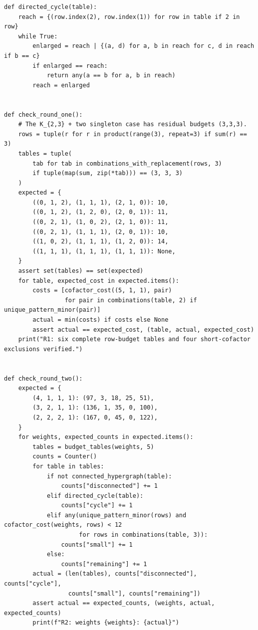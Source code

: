 \documentclass[11pt,a4paper,oneside]{report}
\theoremstyle{definition}
\theoremstyle{remark}
\begin{document}
\begin{lstlisting}
def directed_cycle(table):
    reach = {(row.index(2), row.index(1)) for row in table if 2 in row}
    while True:
        enlarged = reach | {(a, d) for a, b in reach for c, d in reach if b == c}
        if enlarged == reach:
            return any(a == b for a, b in reach)
        reach = enlarged


def check_round_one():
    # The K_{2,3} + two singleton case has residual budgets (3,3,3).
    rows = tuple(r for r in product(range(3), repeat=3) if sum(r) == 3)
    tables = tuple(
        tab for tab in combinations_with_replacement(rows, 3)
        if tuple(map(sum, zip(*tab))) == (3, 3, 3)
    )
    expected = {
        ((0, 1, 2), (1, 1, 1), (2, 1, 0)): 10,
        ((0, 1, 2), (1, 2, 0), (2, 0, 1)): 11,
        ((0, 2, 1), (1, 0, 2), (2, 1, 0)): 11,
        ((0, 2, 1), (1, 1, 1), (2, 0, 1)): 10,
        ((1, 0, 2), (1, 1, 1), (1, 2, 0)): 14,
        ((1, 1, 1), (1, 1, 1), (1, 1, 1)): None,
    }
    assert set(tables) == set(expected)
    for table, expected_cost in expected.items():
        costs = [cofactor_cost((5, 1, 1), pair)
                 for pair in combinations(table, 2) if unique_pattern_minor(pair)]
        actual = min(costs) if costs else None
        assert actual == expected_cost, (table, actual, expected_cost)
    print("R1: six complete row-budget tables and four short-cofactor exclusions verified.")


def check_round_two():
    expected = {
        (4, 1, 1, 1): (97, 3, 18, 25, 51),
        (3, 2, 1, 1): (136, 1, 35, 0, 100),
        (2, 2, 2, 1): (167, 0, 45, 0, 122),
    }
    for weights, expected_counts in expected.items():
        tables = budget_tables(weights, 5)
        counts = Counter()
        for table in tables:
            if not connected_hypergraph(table):
                counts["disconnected"] += 1
            elif directed_cycle(table):
                counts["cycle"] += 1
            elif any(unique_pattern_minor(rows) and cofactor_cost(weights, rows) < 12
                     for rows in combinations(table, 3)):
                counts["small"] += 1
            else:
                counts["remaining"] += 1
        actual = (len(tables), counts["disconnected"], counts["cycle"],
                  counts["small"], counts["remaining"])
        assert actual == expected_counts, (weights, actual, expected_counts)
        print(f"R2: weights {weights}: {actual}")



\end{lstlisting}
\end{document}
